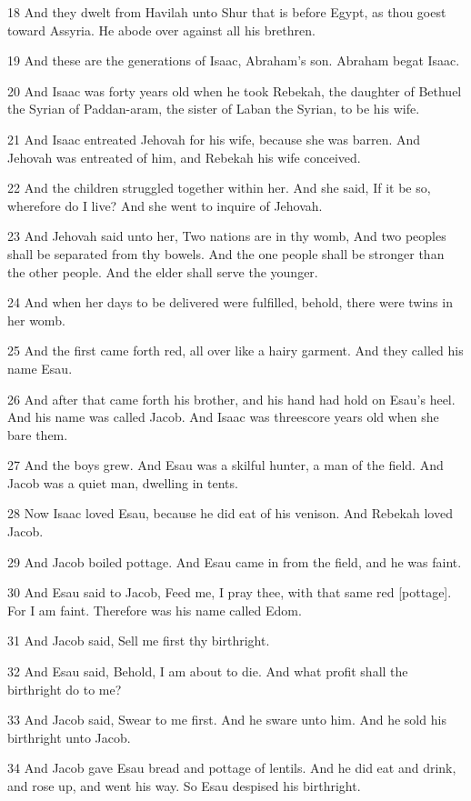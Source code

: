 \par 18 And they dwelt from Havilah unto Shur that is before Egypt, as thou goest toward Assyria. He abode over against all his brethren.
\par 19 And these are the generations of Isaac, Abraham's son. Abraham begat Isaac.
\par 20 And Isaac was forty years old when he took Rebekah, the daughter of Bethuel the Syrian of Paddan-aram, the sister of Laban the Syrian, to be his wife.
\par 21 And Isaac entreated Jehovah for his wife, because she was barren. And Jehovah was entreated of him, and Rebekah his wife conceived.
\par 22 And the children struggled together within her. And she said, If it be so, wherefore do I live? And she went to inquire of Jehovah.
\par 23 And Jehovah said unto her, Two nations are in thy womb, And two peoples shall be separated from thy bowels. And the one people shall be stronger than the other people. And the elder shall serve the younger.
\par 24 And when her days to be delivered were fulfilled, behold, there were twins in her womb.
\par 25 And the first came forth red, all over like a hairy garment. And they called his name Esau.
\par 26 And after that came forth his brother, and his hand had hold on Esau's heel. And his name was called Jacob. And Isaac was threescore years old when she bare them.
\par 27 And the boys grew. And Esau was a skilful hunter, a man of the field. And Jacob was a quiet man, dwelling in tents.
\par 28 Now Isaac loved Esau, because he did eat of his venison. And Rebekah loved Jacob.
\par 29 And Jacob boiled pottage. And Esau came in from the field, and he was faint.
\par 30 And Esau said to Jacob, Feed me, I pray thee, with that same red [pottage]. For I am faint. Therefore was his name called Edom.
\par 31 And Jacob said, Sell me first thy birthright.
\par 32 And Esau said, Behold, I am about to die. And what profit shall the birthright do to me?
\par 33 And Jacob said, Swear to me first. And he sware unto him. And he sold his birthright unto Jacob.
\par 34 And Jacob gave Esau bread and pottage of lentils. And he did eat and drink, and rose up, and went his way. So Esau despised his birthright.

